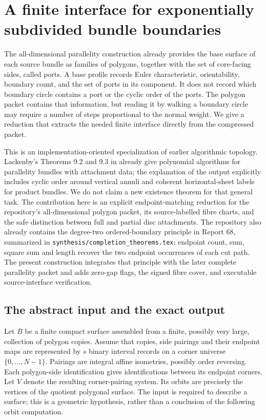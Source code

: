 \section{A finite interface for exponentially subdivided bundle boundaries}
\label{sec:port-boundary-theorem}

The all-dimensional parallelity construction already provides the base
surface of each source bundle as families of polygons, together with the
set of core-facing sides, called ports.  A base profile records Euler
characteristic, orientability, boundary count, and the set of ports in its
component.  It does not record which boundary circle contains a port or
the cyclic order of the ports.  The polygon packet contains that information,
but reading it by walking a boundary circle may require a number of steps
proportional to the normal weight.  We give a reduction that extracts the
needed finite interface directly from the compressed packet.

This is an implementation-oriented specialization of earlier algorithmic
topology.  Lackenby's Theorems 9.2 and 9.3 in \cite{Lackenby2021} already
give polynomial algorithms for parallelity bundles with attachment data;
the explanation of the output explicitly includes cyclic order around
vertical annuli and coherent horizontal-sheet labels for product bundles.
We do not claim a new existence theorem for that general task.  The
contribution here is an explicit endpoint-matching reduction for the
repository's all-dimensional polygon packet, its source-labelled fibre
charts, and the safe distinction between full and partial disc attachments.
The repository also already contains the degree-two ordered-boundary
principle in Report 68, summarized in
\texttt{synthesis/completion\_theorems.tex}: endpoint count, sum, square
sum and length recover the two endpoint occurrences of each cut path.
The present construction integrates that principle with the later complete
parallelity packet and adds zero-gap flags, the signed fibre cover, and
executable source-interface verification.

\subsection{The abstract input and the exact output}

Let $B$ be a finite compact surface assembled from a finite, possibly very
large, collection of polygon copies.  Assume that copies, side pairings and
their endpoint maps are represented by $s$ binary interval records on a
corner universe $\{0,\ldots,N-1\}$.  Pairings are integral affine
isometries, possibly order reversing.  Each polygon-side identification
gives identifications between its endpoint corners.  Let $V$ denote the
resulting corner-pairing system.  Its orbits are precisely the vertices of
the quotient polygonal surface.  The input is required to describe a
surface; this is a geometric hypothesis, rather than a conclusion of the
following orbit computation.


